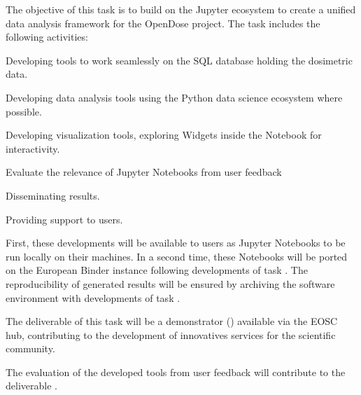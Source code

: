\begin{task}[
  title=Demonstrator: Nuclear Medicine,
  id=opendose-analysis,
  lead=INSERM,
  PM=22,
  wphases={3-33},
  partners={EGI,XFEL}
]


  The objective of this task is to build on the Jupyter ecosystem to create a
  unified data analysis framework for the OpenDose project.
  The task includes the following activities:
  \begin{compactitem}
  \item Developing tools to work seamlessly on the SQL database holding the
    dosimetric data.
  \item Developing data analysis tools using the Python data science ecosystem
    where possible.
  \item Developing visualization tools, exploring Widgets inside the Notebook
    for interactivity.
  \item Evaluate the relevance of Jupyter Notebooks from user feedback
  \item Disseminating results.
  \item Providing support to users.
  \end{compactitem}
  First, these developments will be available to users as Jupyter Notebooks to
  be run locally on their machines. In a second time, these Notebooks will be
  ported on the European Binder instance following developments of task
  . The reproducibility of generated results will be
  ensured by archiving the software environment with developments of task
  .

  The deliverable of this task will be a demonstrator
  () available via the EOSC hub, contributing
  to the development of innovatives services for the scientific community.

  The evaluation of the developed tools from user feedback will contribute to
  the deliverable .

\end{task}
